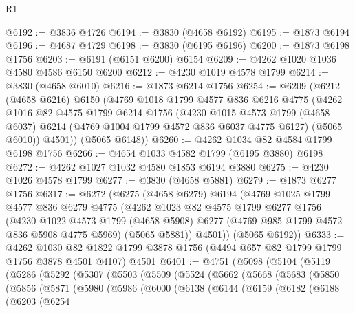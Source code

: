 \begin{lexlean}{R1}
\begin{coremodule}
@6192 := @3836 @4726
@6194 := @3830 (@4658 @6192)
@6195 := @1873 @6194
@6196 := @4687 @4729
@6198 := @3830 (@6195 @6196)
@6200 := @1873 @6198 @1756
@6203 := @6191 (@6151 @6200) @6154
@6209 := @4262 @1020 @1036 @4580 @4586 @6150 @6200
@6212 := @4230 @1019 @4578 @1799
@6214 := @3830 (@4658 @6010)
@6216 := @1873 @6214 @1756
@6254 := @6209
    (@6212
      (@4658 @6216)
      @6150
      (@4769
        @1018
        @1799
        @4577
        @836
        @6216
        @4775
        (@4262
          @1016
          @82
          @4575
          @1799
          @6214
          @1756
          (@4230
            @1015
            @4573
            @1799
            (@4658 @6037)
            @6214
            (@4769 @1004 @1799 @4572 @836 @6037 @4775 @6127)
            (@5065 @6010))
          @4501))
      (@5065 @6148))
@6260 := @4262 @1034 @82 @4584 @1799 @6198 @1756
@6266 := @4654 @1033 @4582 @1799 (@6195 @3880) @6198
@6272 := @4262 @1027 @1032 @4580 @1853 @6194 @3880
@6275 := @4230 @1026 @4578 @1799
@6277 := @3830 (@4658 @5881)
@6279 := @1873 @6277 @1756
@6317 := @6272
    (@6275
      (@4658 @6279)
      @6194
      (@4769
        @1025
        @1799
        @4577
        @836
        @6279
        @4775
        (@4262
          @1023
          @82
          @4575
          @1799
          @6277
          @1756
          (@4230
            @1022
            @4573
            @1799
            (@4658 @5908)
            @6277
            (@4769 @985 @1799 @4572 @836 @5908 @4775 @5969)
            (@5065 @5881))
          @4501))
      (@5065 @6192))
@6333 := @4262
    @1030
    @82
    @1822
    @1799
    @3878
    @1756
    (@4494 @657 @82 @1799 @1799 @1756 @3878 @4501 @4107)
    @4501
@6401 := @4751
    (@5098
      (@5104
        (@5119
          (@5286
            (@5292
              (@5307
                (@5503
                  (@5509
                    (@5524
                      (@5662
                        (@5668
                          (@5683
                            (@5850
                              (@5856
                                (@5871
                                  (@5980
                                    (@5986
                                      (@6000
                                        (@6138
                                          (@6144
                                            (@6159
                                              (@6182
                                                (@6188
                                                  (@6203
                                                    (@6254

\end{coremodule}
\end{lexlean}
